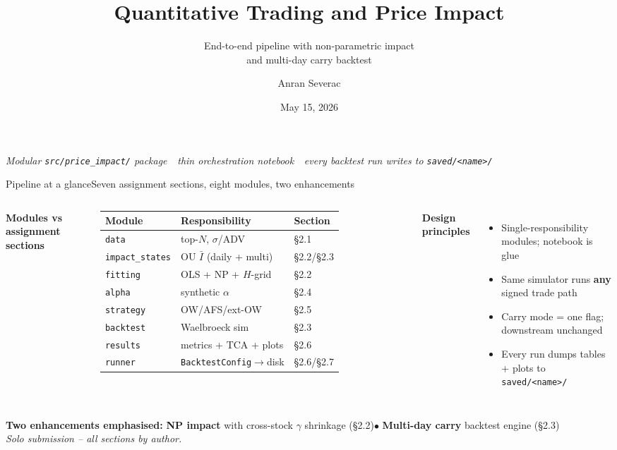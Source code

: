 \documentclass[aspectratio=169,11pt]{beamer}
\title{Quantitative Trading and Price Impact}
\subtitle{End-to-end pipeline with non-parametric impact \\ and multi-day carry backtest}
\author{Anran Severac}
\institute{MSc Mathematics \& Finance \,\textbar\, Final Project}
\date{May 15, 2026}
\newcommand{\hilite}[1]{\textcolor{accent}{\textbf{#1}}}
\begin{document}
\begin{frame}[plain]
  \titlepage
  \vspace*{-1em}
  \centering
  \scriptsize\itshape
  Modular \texttt{src/price\_impact/} package \,\textbar\, thin orchestration
  notebook \,\textbar\, every backtest run writes to \texttt{saved/<name>/}
\end{frame}

\begin{frame}{Pipeline at a glance}{Seven assignment sections, eight modules, two enhancements}

  \begin{columns}[T]
  \scriptsize
  \textbf{Modules vs assignment sections}
  \begin{tabular}{lll}
  \toprule
  Module & Responsibility & Section \\
  \midrule
  \texttt{data}          & top-$N$, $\sigma$/ADV    & \S2.1 \\
  \texttt{impact\_states}& OU $\bar I$ (daily + multi) & \S2.2/\S2.3 \\
  \texttt{fitting}       & OLS + NP + $H$-grid    & \S2.2 \\
  \texttt{alpha}         & synthetic $\alpha$        & \S2.4 \\
  \texttt{strategy}      & OW/AFS/ext-OW             & \S2.5 \\
  \texttt{backtest}      & Waelbroeck sim            & \S2.3 \\
  \texttt{results}       & metrics + TCA + plots     & \S2.6 \\
  \texttt{runner}        & \texttt{BacktestConfig}$\to$disk & \S2.6/\S2.7 \\
  \bottomrule
  \end{tabular}

  \scriptsize
  \textbf{Design principles}
  \begin{itemize}
    \item Single-responsibility modules; notebook is glue
    \item Same simulator runs \hilite{any} signed trade path
    \item Carry mode = one flag; downstream unchanged
    \item Every run dumps tables + plots to \texttt{saved/<name>/}
  \end{itemize}
  \end{columns}

  \vspace{0.6em}
  \begin{center}
  \footnotesize\textbf{Two enhancements emphasised:}\;\;
  \hilite{NP impact} with cross-stock $\gamma$ shrinkage (\S2.2)\;\;$\bullet$\;\;
  \hilite{Multi-day carry} backtest engine (\S2.3)\\[2pt]
  \scriptsize\itshape Solo submission -- all sections by author.
  \end{center}
\end{frame}
\end{document}
